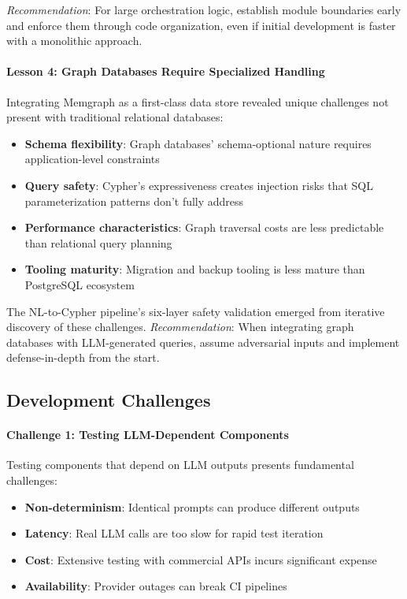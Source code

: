 \textit{Recommendation}: For large orchestration logic, establish module boundaries early and enforce them through code organization, even if initial development is faster with a monolithic approach.

\paragraph{Lesson 4: Graph Databases Require Specialized Handling}

Integrating Memgraph as a first-class data store revealed unique challenges not present with traditional relational databases:

\begin{itemize}
    \item \textbf{Schema flexibility}: Graph databases' schema-optional nature requires application-level constraints
    \item \textbf{Query safety}: Cypher's expressiveness creates injection risks that SQL parameterization patterns don't fully address
    \item \textbf{Performance characteristics}: Graph traversal costs are less predictable than relational query planning
    \item \textbf{Tooling maturity}: Migration and backup tooling is less mature than PostgreSQL ecosystem
\end{itemize}

The NL-to-Cypher pipeline's six-layer safety validation emerged from iterative discovery of these challenges. \textit{Recommendation}: When integrating graph databases with LLM-generated queries, assume adversarial inputs and implement defense-in-depth from the start.

\subsection{Development Challenges}

\paragraph{Challenge 1: Testing LLM-Dependent Components}

Testing components that depend on LLM outputs presents fundamental challenges:

\begin{itemize}
    \item \textbf{Non-determinism}: Identical prompts can produce different outputs
    \item \textbf{Latency}: Real LLM calls are too slow for rapid test iteration
    \item \textbf{Cost}: Extensive testing with commercial APIs incurs significant expense
    \item \textbf{Availability}: Provider outages can break CI pipelines
\end{itemize}

